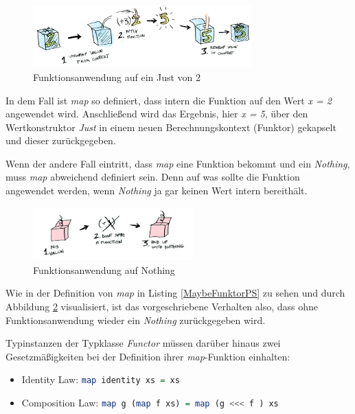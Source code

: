 \documentclass[
12pt,
ngerman,
oneside]
{scrbook} %
\begin{document}
\begin{figure}[htb!]
	\centering
	\includegraphics[width=0.75\textwidth]{Pictures/fmap-just.png}
	\caption{Funktionsanwendung auf ein Just von 2 \cite[][]{AdityaBhargava13}}
	\label{fig:MaybeJust}
\end{figure}

In dem Fall ist \emph{map} so definiert, dass intern die Funktion auf den Wert \emph{x = 2} angewendet wird. Anschließend wird das Ergebnis, hier \emph{x = 5}, über den Wertkonstruktor \emph{Just} in einem neuen Berechnungskontext (Funktor) gekapselt und dieser zurückgegeben.

Wenn der andere Fall eintritt, dass \emph{map} eine Funktion bekommt und ein \emph{Nothing}, muss \emph{map} abweichend definiert sein. Denn auf was sollte die Funktion angewendet werden, wenn \emph{Nothing} ja gar keinen Wert intern bereithält.

\begin{figure}[htb!]
	\centering
	\includegraphics[width=0.55\textwidth]{Pictures/fmap-nothing.png}
	\caption{Funktionsanwendung auf Nothing \cite[][]{AdityaBhargava13}}
	\label{fig:MaybeNothing}
\end{figure}

Wie in der Definition von \emph{map} in Listing \ref{MaybeFunktorPS} zu sehen und durch Abbildung \ref{fig:MaybeNothing} visualisiert, ist das vorgeschriebene Verhalten also, dass ohne Funktionsanwendung wieder ein \emph{Nothing} zurückgegeben wird.

Typinstanzen der Typklasse \emph{Functor} müssen darüber hinaus zwei Gesetzmäßigkeiten bei der Definition ihrer \emph{map}-Funktion einhalten:

\begin{itemize}
	\item Identity Law: \lstinline[language=purescript, columns=fixed]{map identity xs = xs}
	\item Composition Law: \lstinline[language=purescript, columns=fixed]{map g (map f xs) = map (g <<< f ) xs}
\end{itemize}
\end{document}

